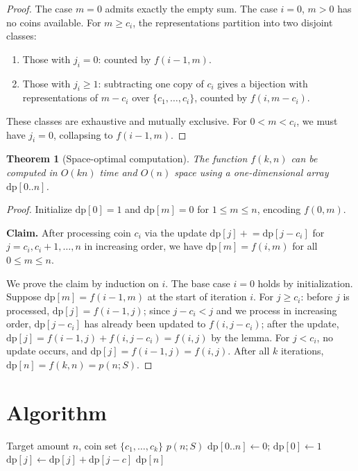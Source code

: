 \documentclass[12pt]{article}
\newtheorem{theorem}{Theorem}
\theoremstyle{definition}
\begin{document}
\begin{proof}
The case $m = 0$ admits exactly the empty sum. The case $i = 0$, $m > 0$ has no coins available. For $m \ge c_i$, the representations partition into two disjoint classes:
\begin{enumerate}
\item Those with $j_i = 0$: counted by $f(i-1, m)$.
\item Those with $j_i \ge 1$: subtracting one copy of $c_i$ gives a bijection with representations of $m - c_i$ over $\{c_1, \ldots, c_i\}$, counted by $f(i, m - c_i)$.
\end{enumerate}
These classes are exhaustive and mutually exclusive. For $0 < m < c_i$, we must have $j_i = 0$, collapsing to $f(i-1, m)$.
\end{proof}

\begin{theorem}[Space-optimal computation]
The function $f(k, n)$ can be computed in $O(kn)$ time and $O(n)$ space using a one-dimensional array $\mathrm{dp}[0..n]$.
\end{theorem}

\begin{proof}
Initialize $\mathrm{dp}[0] = 1$ and $\mathrm{dp}[m] = 0$ for $1 \le m \le n$, encoding $f(0, m)$.

\textbf{Claim.} After processing coin $c_i$ via the update $\mathrm{dp}[j] \mathrel{+}= \mathrm{dp}[j - c_i]$ for $j = c_i, c_i + 1, \ldots, n$ in increasing order, we have $\mathrm{dp}[m] = f(i, m)$ for all $0 \le m \le n$.

We prove the claim by induction on $i$. The base case $i = 0$ holds by initialization. Suppose $\mathrm{dp}[m] = f(i-1, m)$ at the start of iteration $i$. For $j \ge c_i$: before $j$ is processed, $\mathrm{dp}[j] = f(i-1, j)$; since $j - c_i < j$ and we process in increasing order, $\mathrm{dp}[j - c_i]$ has already been updated to $f(i, j - c_i)$; after the update, $\mathrm{dp}[j] = f(i-1, j) + f(i, j - c_i) = f(i, j)$ by the lemma. For $j < c_i$, no update occurs, and $\mathrm{dp}[j] = f(i-1, j) = f(i, j)$. After all $k$ iterations, $\mathrm{dp}[n] = f(k, n) = p(n; S)$.
\end{proof}

\section{Algorithm}

\begin{algorithm}[H]
\caption{Coin Change Count}
\begin{algorithmic}[1]
\REQUIRE Target amount $n$, coin set $\{c_1, \ldots, c_k\}$
\ENSURE $p(n; S)$
\STATE $\mathrm{dp}[0..n] \gets 0$; \quad $\mathrm{dp}[0] \gets 1$
        \STATE $\mathrm{dp}[j] \gets \mathrm{dp}[j] + \mathrm{dp}[j - c]$
    \ENDFOR
\ENDFOR
\RETURN $\mathrm{dp}[n]$
\end{algorithmic}
\end{algorithm}
\end{document}

